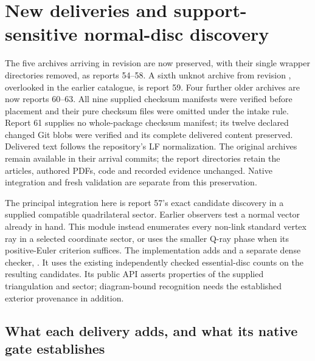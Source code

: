 \section{New deliveries and support-sensitive normal-disc discovery}
\label{sec:incoming-sectors}

The five archives arriving in revision  are now preserved,
with their single wrapper directories removed, as reports 54--58. A sixth
unknot archive from revision , overlooked in the earlier
catalogue, is report 59. Four further older archives are now reports 60--63.
All nine supplied checksum manifests were verified before placement and
their pure checksum files were omitted under the intake rule. Report 61
supplies no whole-package checksum manifest; its twelve declared changed
Git blobs were verified and its complete delivered content preserved.
Delivered text follows the repository's LF normalization. The original
archives remain available in their arrival commits; the report directories
retain the articles, authored PDFs, code and recorded evidence unchanged.
Native integration and fresh validation are separate from this preservation.

The principal integration here is report 57's exact candidate discovery in
a supplied compatible quadrilateral sector. Earlier observers test a normal
vector already in hand. This module instead enumerates every non-link
standard vertex ray in a selected coordinate sector, or uses the smaller
Q-ray phase when its positive-Euler criterion suffices. The implementation
adds  and a separate dense checker,
. It uses the existing independently
checked essential-disc counts on the resulting candidates. Its public API
asserts properties of the supplied triangulation and sector; diagram-bound
recognition needs the established exterior provenance in addition.

\subsection{What each delivery adds, and what its native gate establishes}

